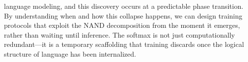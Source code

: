 language modeling, and this discovery occurs at a predictable phase transition. By understanding when and how this collapse happens, we can design training protocols that exploit the NAND decomposition from the moment it emerges, rather than waiting until inference. The softmax is not just computationally redundant---it is a temporary scaffolding that training discards once the logical structure of language has been internalized.\n\n%